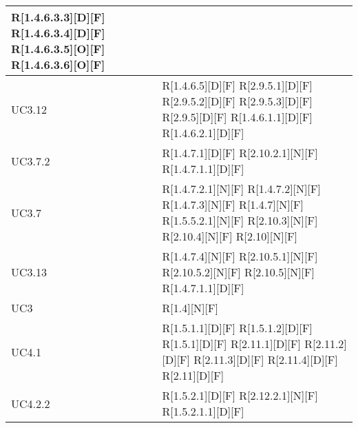 \begin{longtable}{X | X}
R[1.4.6.3.3][D][F] \newline
R[1.4.6.3.4][D][F] \newline
R[1.4.6.3.5][O][F] \newline
R[1.4.6.3.6][O][F]  \\
\hline
UC3.12 & R[1.4.6.5][D][F] \newline
R[2.9.5.1][D][F] \newline
R[2.9.5.2][D][F] \newline
R[2.9.5.3][D][F] \newline
R[2.9.5][D][F] \newline
R[1.4.6.1.1][D][F] \newline
R[1.4.6.2.1][D][F]  \\
\hline
UC3.7.2 & R[1.4.7.1][D][F] \newline
R[2.10.2.1][N][F] \newline
R[1.4.7.1.1][D][F]  \\
\hline
UC3.7 & R[1.4.7.2.1][N][F] \newline
R[1.4.7.2][N][F] \newline
R[1.4.7.3][N][F] \newline
R[1.4.7][N][F] \newline
R[1.5.5.2.1][N][F] \newline
R[2.10.3][N][F] \newline
R[2.10.4][N][F] \newline
R[2.10][N][F]  \\
\hline
UC3.13 & R[1.4.7.4][N][F] \newline
R[2.10.5.1][N][F] \newline
R[2.10.5.2][N][F] \newline
R[2.10.5][N][F] \newline
R[1.4.7.1.1][D][F]  \\
\hline
UC3 & R[1.4][N][F]  \\
\hline
UC4.1 & R[1.5.1.1][D][F] \newline
R[1.5.1.2][D][F] \newline
R[1.5.1][D][F] \newline
R[2.11.1][D][F] \newline
R[2.11.2][D][F] \newline
R[2.11.3][D][F] \newline
R[2.11.4][D][F] \newline
R[2.11][D][F]  \\
\hline
UC4.2.2 & R[1.5.2.1][D][F] \newline
R[2.12.2.1][N][F] \newline
R[1.5.2.1.1][D][F]  \\

\end{longtable}

